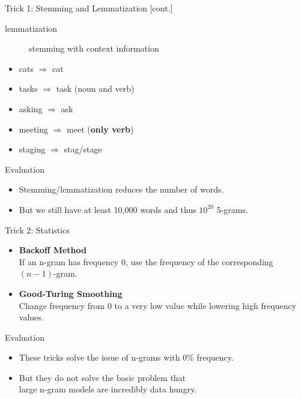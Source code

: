 \documentclass[professionalfonts, xcolor={usenames,svgnames,x11names,table}]{beamer}
\begin{document}
\begin{frame}{Trick 1: Stemming and Lemmatization [cont.]}
    \begin{description}
        \item[lemmatization] stemming with context information
    \end{description}

    \begin{example}
        \begin{itemize}
            \item cats $\Rightarrow$ cat
            \item tasks $\Rightarrow$ task (noun and verb)
            \item asking $\Rightarrow$ ask
            \item meeting $\Rightarrow$ meet (\textbf{only verb})
            \item staging $\Rightarrow$ stag\slash stage
        \end{itemize}
    \end{example}

    \begin{block}{Evaluation}
        \begin{itemize}
            \item Stemming\slash lemmatization reduces the number of words.
            \item But we still have at least 10,000 words and thus $10^{20}$ 5-grams.
        \end{itemize}
    \end{block}
\end{frame}

\begin{frame}{Trick 2: Statistics}
    \begin{itemize}
        \item \textbf{Backoff Method}\\
            If an n-gram has frequency $0$, use the frequency of the corresponding $(n-1)$-gram.
        \item \textbf{Good-Turing Smoothing}\\
            Change frequency from $0$ to a very low value while lowering high frequency values.
    \end{itemize}

    \begin{block}{Evaluation}
        \begin{itemize}
            \item These tricks solve the issue of n-grams with 0\% frequency.
            \item But they do not solve the basic problem that\\
                  large n-gram models are incredibly data hungry.
        \end{itemize}
    \end{block}
\end{frame}
\end{document}
